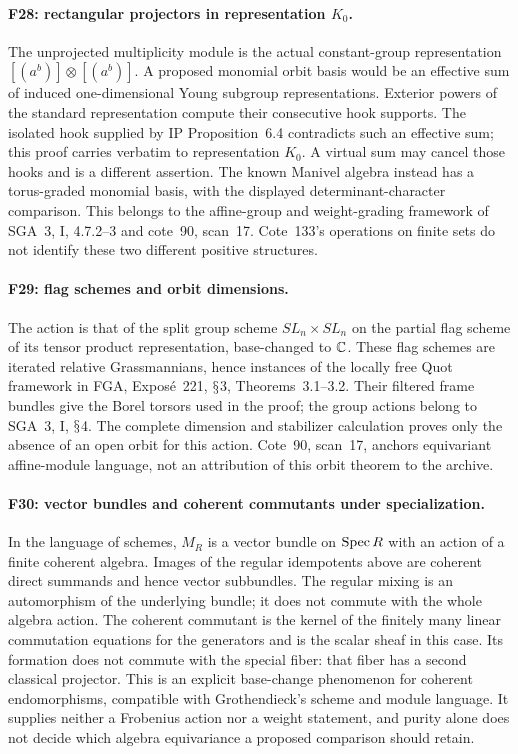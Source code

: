 \documentclass[11pt,a4paper]{article}
\renewcommand{\S}{\ensuremath{\mathsection}}
\newcommand{\fid}[1]{\textsf{#1}}\newcommand{\gate}[1]{\textsf{#1}}
\theoremstyle{named}\newtheorem{finding}{Finding}[section]
\theoremstyle{definition}\newtheorem{definition}[finding]{Definition}
\theoremstyle{remark}\newtheorem{remark}[finding]{Remark}
\begin{document}
\paragraph{\fid{F28}: rectangular projectors in representation $K_0$.}
The unprojected multiplicity module is the actual constant-group
representation $[(a^b)]\otimes[(a^b)]$. A proposed monomial orbit
basis would be an effective sum of induced one-dimensional Young
subgroup representations. Exterior powers of the standard
representation compute their consecutive hook supports. The
isolated hook supplied by IP Proposition~6.4 contradicts such an
effective sum; this proof carries verbatim to representation $K_0$.
A virtual sum may cancel those hooks and is a different assertion.
The known Manivel algebra instead has a torus-graded monomial basis,
with the displayed determinant-character comparison. This belongs
to the affine-group and weight-grading framework of SGA~3, I,
4.7.2--3 and cote~90, scan~17. Cote~133's operations on finite sets
do not identify these two different positive structures.


\paragraph{\fid{F29}: flag schemes and orbit dimensions.}
The action is that of the split group scheme $SL_n\times SL_n$ on
the partial flag scheme of its tensor product representation,
base-changed to $\mathbb C$. These flag schemes are iterated relative
Grassmannians, hence instances of the locally free Quot framework
in FGA, Expos\'e~221, \S3, Theorems~3.1--3.2. Their filtered
frame bundles give the Borel torsors used in the proof; the group
actions belong to SGA~3, I, \S4. The complete dimension and
stabilizer calculation proves only the absence of an open orbit for
this action. Cote~90, scan~17, anchors equivariant affine-module
language, not an attribution of this orbit theorem to the archive.

\paragraph{\fid{F30}: vector bundles and coherent commutants under specialization.}
In the language of schemes, $M_R$ is a vector bundle on $\operatorname{Spec} R$
with an action of a finite coherent algebra. Images of the regular
idempotents above are coherent direct summands and hence vector
subbundles. The regular mixing is an automorphism of the underlying
bundle; it does not commute with the whole algebra action. The coherent
commutant is the kernel of the finitely many linear commutation
equations for the generators and is the scalar sheaf in this case.
Its formation does not commute with the special fiber: that fiber
has a second classical projector. This is an explicit base-change
phenomenon for coherent endomorphisms, compatible with Grothendieck's
scheme and module language. It supplies neither a Frobenius action nor
a weight statement, and purity alone does not decide which algebra
equivariance a proposed comparison should retain.
\end{document}
